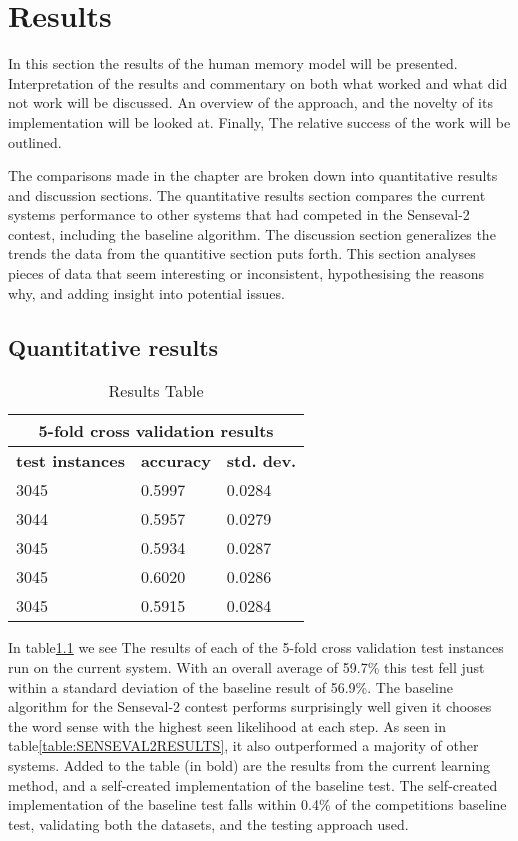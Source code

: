 \chapter{Results}

In this section the results of the human memory model will be presented.  Interpretation of the results and commentary on both what worked and what did not work will be discussed. An overview of the approach, and the novelty of its implementation will be looked at. Finally, The relative success of the work will be outlined.

The comparisons made in the chapter are broken down into quantitative results and discussion sections. The quantitative results section compares the current systems performance to other systems that had competed in the Senseval-2 contest, including the baseline algorithm.  The discussion section generalizes the trends the data from the quantitive section puts forth. This section analyses pieces of data that seem interesting or inconsistent, hypothesising the reasons why, and adding insight into potential issues.

\section{Quantitative results}

\begin{table}[htp]
	\begin{center}
		\begin{tabular}{|l|l|l|}
			\hline
				\multicolumn{3}{|c|}{\bf 5-fold cross validation results } \\
				\hline
				{\bf test instances} & {\bf accuracy} & {\bf std. dev.} \\ \hline 
				3045 & 0.5997 & 0.0284    \\ \hline 
				3044 & 0.5957 & 0.0279 \\ \hline 
				3045 & 0.5934 & 0.0287 \\ \hline 
				3045 & 0.6020 & 0.0286 \\ \hline 
				3045 & 0.5915 & 0.0284 \\ \hline
		\end{tabular}
		\caption{Results Table \label{table:RESULTS}}
	\end{center}
\end{table}

In table\ref{table:RESULTS} we see The results of each of the 5-fold cross validation test instances run on the current system.  With an overall average of 59.7\% this test fell just within a standard deviation of the baseline result of 56.9\%. The baseline algorithm for the Senseval-2 contest performs surprisingly well given it chooses the word sense with the highest seen likelihood at each step.  As seen in table\ref{table:SENSEVAL2RESULTS}, it also outperformed a majority of other systems. Added to the table (in bold) are the results from the current learning method, and a self-created implementation of the baseline test.  The self-created implementation of the baseline test falls within 0.4\% of the competitions baseline test, validating both the datasets, and the testing approach used.

